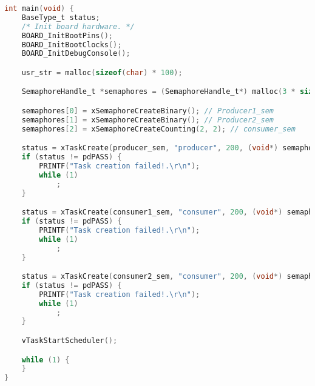 \begin{lstlisting}[language=c,caption=Problem 3 main, label=list:p3_main]
int main(void) {
    BaseType_t status;
    /* Init board hardware. */
    BOARD_InitBootPins();
    BOARD_InitBootClocks();
    BOARD_InitDebugConsole();

    usr_str = malloc(sizeof(char) * 100);

    SemaphoreHandle_t *semaphores = (SemaphoreHandle_t*) malloc(3 * sizeof(SemaphoreHandle_t));

    semaphores[0] = xSemaphoreCreateBinary(); // Producer1_sem
    semaphores[1] = xSemaphoreCreateBinary(); // Producer2_sem
    semaphores[2] = xSemaphoreCreateCounting(2, 2); // consumer_sem

    status = xTaskCreate(producer_sem, "producer", 200, (void*) semaphores, 2, NULL);
    if (status != pdPASS) {
        PRINTF("Task creation failed!.\r\n");
        while (1)
            ;
    }

    status = xTaskCreate(consumer1_sem, "consumer", 200, (void*) semaphores, 2, NULL);
    if (status != pdPASS) {
        PRINTF("Task creation failed!.\r\n");
        while (1)
            ;
    }

    status = xTaskCreate(consumer2_sem, "consumer", 200, (void*) semaphores, 3, NULL);
    if (status != pdPASS) {
        PRINTF("Task creation failed!.\r\n");
        while (1)
            ;
    }

    vTaskStartScheduler();

    while (1) {
    }
}
\end{lstlisting}
